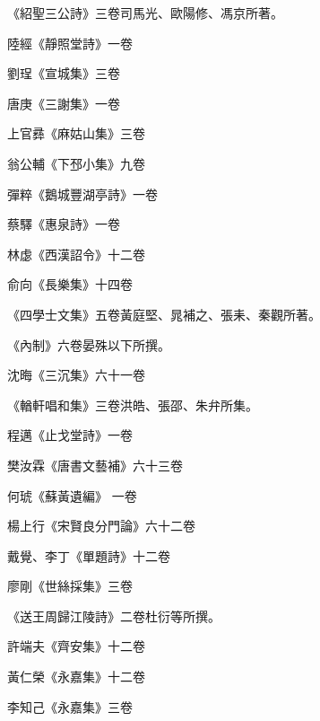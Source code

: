 \begin{pinyinscope}
 《紹聖三公詩》三卷司馬光、歐陽修、馮京所著。



 陸經《靜照堂詩》一卷



 劉珵《宣城集》三卷



 唐庚《三謝集》一卷



 上官彞《麻姑山集》三卷



 翁公輔《下邳小集》九卷



 彈粹《鵝城豐湖亭詩》一卷



 蔡驛《惠泉詩》一卷



 林虙《西漢詔令》十二卷



 俞向《長樂集》十四卷



 《四學士文集》五卷黃庭堅、晁補之、張耒、秦觀所著。



 《內制》六卷晏殊以下所撰。



 沈晦《三沉集》六十一卷



 《輶軒唱和集》三卷洪皓、張邵、朱弁所集。



 程邁《止戈堂詩》一卷



 樊汝霖《唐書文藝補》六十三卷



 何琥《蘇黃遺編》
 一卷



 楊上行《宋賢良分門論》六十二卷



 戴覺、李丁《單題詩》十二卷



 廖剛《世絲採集》三卷



 《送王周歸江陵詩》二卷杜衍等所撰。



 許端夫《齊安集》十二卷



 黃仁榮《永嘉集》十二卷



 李知己《永嘉集》三卷




\end{pinyinscope}
